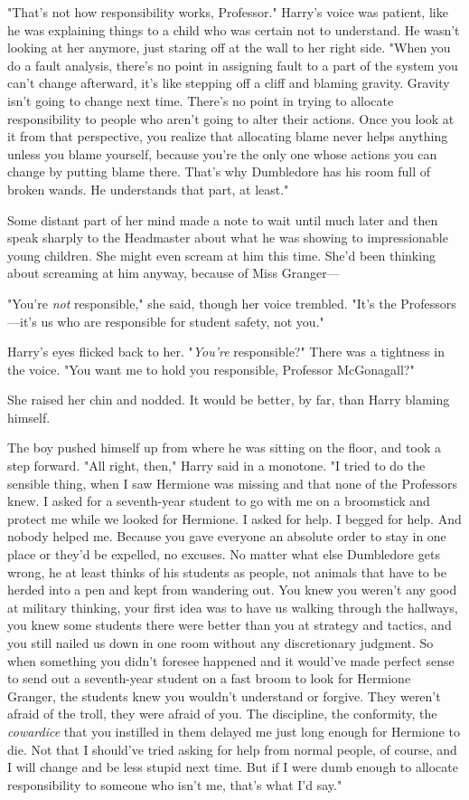 "That's not how responsibility works, Professor." Harry's voice was patient, like he was explaining things to a child who was certain not to understand. He wasn't looking at her anymore, just staring off at the wall to her right side. "When you do a fault analysis, there's no point in assigning fault to a part of the system you can't change afterward, it's like stepping off a cliff and blaming gravity. Gravity isn't going to change next time. There's no point in trying to allocate responsibility to people who aren't going to alter their actions. Once you look at it from that perspective, you realize that allocating blame never helps anything unless you blame yourself, because you're the only one whose actions you can change by putting blame there. That's why Dumbledore has his room full of broken wands. He understands that part, at least."

Some distant part of her mind made a note to wait until much later and then speak sharply to the Headmaster about what he was showing to impressionable young children. She might even scream at him this time. She'd been thinking about screaming at him anyway, because of Miss Granger---

"You're \emph{not} responsible," she said, though her voice trembled. "It's the Professors---it's us who are responsible for student safety, not you."

Harry's eyes flicked back to her. "\emph{You're} responsible?" There was a tightness in the voice. "You want me to hold you responsible, Professor McGonagall?"

She raised her chin and nodded. It would be better, by far, than Harry blaming himself.

The boy pushed himself up from where he was sitting on the floor, and took a step forward. "All right, then," Harry said in a monotone. "I tried to do the sensible thing, when I saw Hermione was missing and that none of the Professors knew. I asked for a seventh-year student to go with me on a broomstick and protect me while we looked for Hermione. I asked for help. I begged for help. And nobody helped me. Because you gave everyone an absolute order to stay in one place or they'd be expelled, no excuses. No matter what else Dumbledore gets wrong, he at least thinks of his students as people, not animals that have to be herded into a pen and kept from wandering out. You knew you weren't any good at military thinking, your first idea was to have us walking through the hallways, you knew some students there were better than you at strategy and tactics, and you still nailed us down in one room without any discretionary judgment. So when something you didn't foresee happened and it would've made perfect sense to send out a seventh-year student on a fast broom to look for Hermione Granger, the students knew you wouldn't understand or forgive. They weren't afraid of the troll, they were afraid of you. The discipline, the conformity, the \emph{cowardice} that you instilled in them delayed me just long enough for Hermione to die. Not that I should've tried asking for help from normal people, of course, and I will change and be less stupid next time. But if I were dumb enough to allocate responsibility to someone who isn't me, that's what I'd say."

